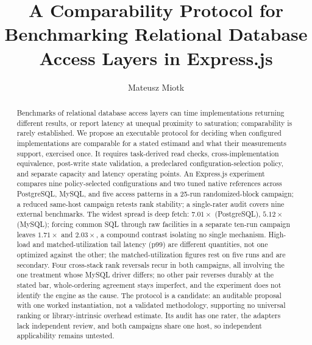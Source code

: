 \documentclass[review]{elsarticle}
\begin{document}
\begin{frontmatter}

\title{A Comparability Protocol for Benchmarking Relational Database
  Access Layers in Express.js}

\author[ug]{Mateusz Miotk}

\begin{abstract}
Benchmarks of relational database access layers can time implementations returning different
results, or report latency at unequal proximity to saturation; comparability is rarely established.
We propose an executable protocol for deciding when configured implementations are comparable for a
stated estimand and what their measurements support, exercised once.
It requires task-derived read checks, cross-implementation equivalence, post-write state validation,
a predeclared configuration-selection policy, and separate capacity and latency operating points.
An Express.js experiment compares nine policy-selected configurations and two tuned native references
across PostgreSQL, MySQL, and five access patterns in a 25-run randomized-block campaign; a reduced
same-host campaign retests rank stability; a single-rater audit covers nine external benchmarks.
The widest spread is deep fetch: $7.01\times$ (PostgreSQL), $5.12\times$ (MySQL); forcing common SQL
through raw facilities in a separate ten-run campaign leaves $1.71\times$ and $2.03\times$, a
compound contrast isolating no single mechanism.
High-load and matched-utilization tail latency (p99) are different quantities, not one optimized against the other;
the matched-utilization figures rest on five runs and are secondary.
Four cross-stack rank reversals recur in both campaigns, all involving the one treatment whose MySQL
driver differs; no other pair reverses durably at the stated bar, whole-ordering agreement stays
imperfect, and the experiment does not identify the engine as the cause.
The protocol is a candidate: an auditable proposal with one worked instantiation, not a validated
methodology, supporting no universal ranking or library-intrinsic overhead estimate.
Its audit has one rater, the adapters lack independent review, and both campaigns share one host, so
independent applicability remains untested.
\end{abstract}


\end{frontmatter}
\end{document}
